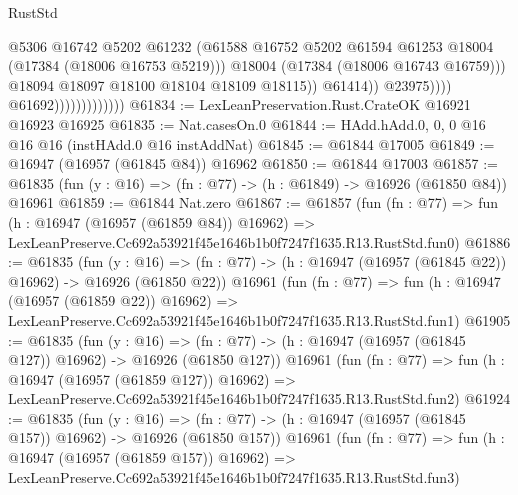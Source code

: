 \begin{lexlean}{RustStd}
\begin{coremodule}
                                                @5306
                                                @16742
                                                @5202
                                                @61232
                                                (@61588
                                                  @16752
                                                  @5202
                                                  @61594
                                                  @61253
                                                  @18004
                                                  (@17384 (@18006 @16753 @5219)))
                                                @18004
                                                (@17384 (@18006 @16743 @16759)))
                                              @18094
                                              @18097
                                              @18100
                                              @18104
                                              @18109
                                              @18115))
                                          @61414))
                                      @23975))))
                              @61692)))))))))))))
@61834 := LexLeanPreservation.Rust.CrateOK @16921 @16923 @16925
@61835 := Nat.casesOn.{0}
@61844 := HAdd.hAdd.{0, 0, 0} @16 @16 @16 (instHAdd.{0} @16 instAddNat)
@61845 := @61844 @17005
@61849 := @16947 (@16957 (@61845 @84)) @16962
@61850 := @61844 @17003
@61857 := @61835 (fun (y : @16) => (fn : @77) -> (h : @61849) -> @16926 (@61850 @84)) @16961
@61859 := @61844 Nat.zero
@61867 := @61857
    (fun (fn : @77) =>
    fun (h : @16947 (@16957 (@61859 @84)) @16962) =>
    LexLeanPreserve.Cc692a53921f45e1646b1b0f7247f1635.R13.RustStd.fun0)
@61886 := @61835
    (fun (y : @16) =>
    (fn : @77) -> (h : @16947 (@16957 (@61845 @22)) @16962) -> @16926 (@61850 @22))
    @16961
    (fun (fn : @77) =>
    fun (h : @16947 (@16957 (@61859 @22)) @16962) =>
    LexLeanPreserve.Cc692a53921f45e1646b1b0f7247f1635.R13.RustStd.fun1)
@61905 := @61835
    (fun (y : @16) =>
    (fn : @77) -> (h : @16947 (@16957 (@61845 @127)) @16962) -> @16926 (@61850 @127))
    @16961
    (fun (fn : @77) =>
    fun (h : @16947 (@16957 (@61859 @127)) @16962) =>
    LexLeanPreserve.Cc692a53921f45e1646b1b0f7247f1635.R13.RustStd.fun2)
@61924 := @61835
    (fun (y : @16) =>
    (fn : @77) -> (h : @16947 (@16957 (@61845 @157)) @16962) -> @16926 (@61850 @157))
    @16961
    (fun (fn : @77) =>
    fun (h : @16947 (@16957 (@61859 @157)) @16962) =>
    LexLeanPreserve.Cc692a53921f45e1646b1b0f7247f1635.R13.RustStd.fun3)

\end{coremodule}
\end{lexlean}
